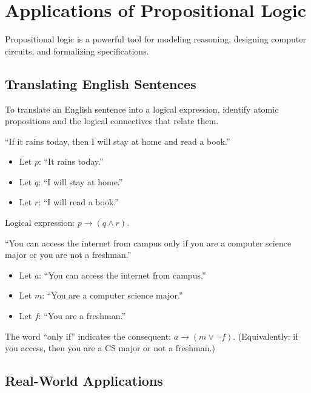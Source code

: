 \documentclass[11pt,a4paper]{article}
\begin{document}
\section{Applications of Propositional Logic}

Propositional logic is a powerful tool for modeling reasoning, designing computer circuits, and formalizing specifications.

\subsection{Translating English Sentences}

To translate an English sentence into a logical expression, identify atomic propositions and the logical connectives that relate them.

\begin{example}
``If it rains today, then I will stay at home and read a book.''
\begin{itemize}
    \item Let $p$: ``It rains today.''
    \item Let $q$: ``I will stay at home.''
    \item Let $r$: ``I will read a book.''
\end{itemize}
Logical expression: $p \to (q \land r)$.
\end{example}

\begin{example}
``You can access the internet from campus only if you are a computer science major or you are not a freshman.''
\begin{itemize}
    \item Let $a$: ``You can access the internet from campus.''
    \item Let $m$: ``You are a computer science major.''
    \item Let $f$: ``You are a freshman.''
\end{itemize}
The word ``only if'' indicates the consequent: $a \to (m \lor \neg f)$. (Equivalently: if you access, then you are a CS major or not a freshman.)
\end{example}

\subsection{Real-World Applications}
\end{document}
